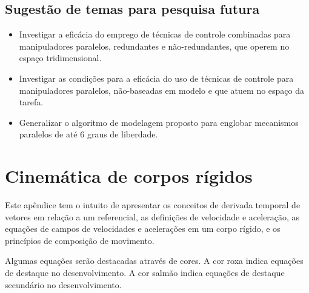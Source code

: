 \documentclass[]{politex}
\begin{document}
\section{Sugestão de temas para pesquisa futura}

\begin{itemize}
\item Investigar a eficácia do emprego de técnicas de controle combinadas para manipuladores paralelos, redundantes e não-redundantes, que operem no espaço tridimensional.
\item Investigar as condições para a eficácia do uso de técnicas de controle para manipuladores paralelos, não-baseadas em modelo e que atuem no espaço da tarefa.
\item Generalizar o algoritmo de modelagem proposto para englobar mecanismos paralelos de até 6 graus de liberdade.
\end{itemize}




%






\apendice

\chapter{Cinemática de corpos rígidos} \label{ap:CinCorposRig}

Este apêndice tem o intuito de apresentar os conceitos de derivada temporal de vetores em relação a um referencial, as definições de velocidade e aceleração, as equações de campos de velocidades e acelerações em um corpo rígido, e os princípios de composição de movimento.

Algumas equações serão destacadas através de cores. A cor roxa indica equações de destaque no desenvolvimento. A cor salmão indica equações de destaque secundário no desenvolvimento.
\end{document}
